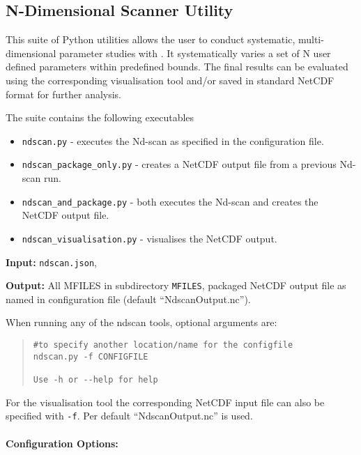 \subsection{N-Dimensional Scanner Utility}

This suite of Python utilities allows the user to conduct systematic, multi-dimensional parameter studies with \process. It systematically varies a set of N user defined parameters within predefined bounds. The final results can be evaluated using the corresponding visualisation tool and/or saved in standard NetCDF format for further analysis.

The suite contains the following executables
\begin{itemize}
\item \texttt{ndscan.py} - executes the Nd-scan as specified in the configuration file.
\item \texttt{ndscan\_package\_only.py} - creates a NetCDF output file from a previous Nd-scan run.
\item \texttt{ndscan\_and\_package.py} - both executes the Nd-scan and creates the NetCDF output file.
\item \texttt{ndscan\_visualisation.py} - visualises the NetCDF output.
\end{itemize}


\begin{description}
\item{\textbf{Input:}}
 \texttt{ndscan.json}, \indat
                                
\item{\textbf{Output:}} All MFILES in subdirectory \texttt{MFILES}, packaged NetCDF output file as named in configuration file (default ``NdscanOutput.nc'').
\end{description}

When running any of the ndscan tools, optional arguments are:
\begin{quote}
\begin{verbatim}
#to specify another location/name for the configfile
ndscan.py -f CONFIGFILE

Use -h or --help for help
\end{verbatim}
\end{quote}
For the visualisation tool the corresponding NetCDF input file can also be specified with \texttt{-f}. Per default ``NdscanOutput.nc'' is used.

\paragraph{Configuration Options:}

